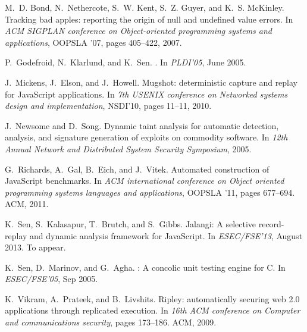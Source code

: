 \documentclass{sig-alternate}
\begin{document}
{\small
\begin{thebibliography}{1}
\vspace{1ex}
M.~D. Bond, N.~Nethercote, S.~W. Kent, S.~Z. Guyer, and K.~S. McKinley.
\newblock Tracking bad apples: reporting the origin of null and undefined value
  errors.
\newblock In {\em ACM SIGPLAN conference on Object-oriented programming systems
  and applications}, OOPSLA '07, pages 405--422, 2007.

P.~Godefroid, N.~Klarlund, and K.~Sen.
.
\newblock In {\em PLDI'05}, June 2005.

J.~Mickens, J.~Elson, and J.~Howell.
\newblock Mugshot: deterministic capture and replay for JavaScript
  applications.
\newblock In {\em 7th USENIX conference on Networked systems design and
  implementation}, NSDI'10, pages 11--11, 2010.

J.~Newsome and D.~Song.
\newblock Dynamic taint analysis for automatic detection, analysis, and
  signature generation of exploits on commodity software.
\newblock In {\em 12th Annual Network and Distributed System Security
  Symposium}, 2005.

G.~Richards, A.~Gal, B.~Eich, and J.~Vitek.
\newblock Automated construction of JavaScript benchmarks.
\newblock In {\em ACM international conference on Object oriented programming
  systems languages and applications}, OOPSLA '11, pages 677--694. ACM, 2011.

K.~Sen, S.~Kalasapur, T.~Brutch, and S.~Gibbs.
\newblock Jalangi: A selective record-replay and dynamic analysis framework for
  JavaScript.
\newblock In {\em ESEC/FSE'13}, August 2013.
\newblock To appear.

K.~Sen, D.~Marinov, and G.~Agha.
: A concolic unit testing engine for {C}.
\newblock In {\em ESEC/FSE'05}, Sep 2005.

K.~Vikram, A.~Prateek, and B.~Livshits.
\newblock Ripley: automatically securing web 2.0 applications through
  replicated execution.
\newblock In {\em 16th ACM conference on Computer and communications security},
  pages 173--186. ACM, 2009.

\end{thebibliography}


% 
% 
}
\end{document}
